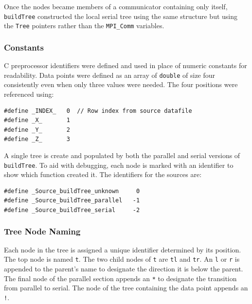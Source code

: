\documentclass{article}
\begin{document}
Once the nodes became members of a communicator containing only itself, \texttt{buildTree} constructed the local serial tree using the same structure but using the \texttt{Tree} pointers rather than the \texttt{MPI\_Comm} variables.


%
%

\subsubsection{Constants}\label{sec:constants}

C preprocessor identifiers were defined and used in place of numeric constants for readability. Data points were defined as an array of \texttt{double} of size four consistently even when only three values were needed. The four positions were referenced using:

\lstset{language=C++, keepspaces=true}
\begin{lstlisting}
#define _INDEX_   0  // Row index from source datafile
#define _X_       1
#define _Y_       2
#define _Z_       3
\end{lstlisting}

A single tree is create and populated by both the parallel and serial versions of \texttt{buildTree}. To aid with debugging, each node is marked with an identifier to show which function created it. The identifiers for the sources are:

\lstset{language=C++, keepspaces=true}
\begin{lstlisting}
#define _Source_buildTree_unknown     0
#define _Source_buildTree_parallel   -1
#define _Source_buildTree_serial     -2
\end{lstlisting}

%
%

\subsubsection{Tree Node Naming}

Each node in the tree is assigned a unique identifier determined by its position. The top node is named \texttt{t}. The two child nodes of \texttt{t} are \texttt{tl} and \texttt{tr}. An \texttt{l} or \texttt{r} is appended to the parent's name to designate the direction it is below the parent. The final node of the parallel section appends an \texttt{*} to designate the transition from parallel to serial. The node of the tree containing the data point appends an \texttt{!}.
\end{document}
